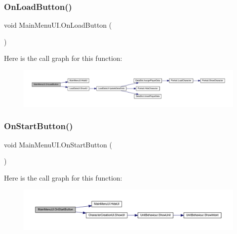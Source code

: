 \subsubsection{\texorpdfstring{OnLoadButton()}{OnLoadButton()}}
{\footnotesize\ttfamily void Main\+Menu\+U\+I.\+On\+Load\+Button (\begin{DoxyParamCaption}{ }\end{DoxyParamCaption})}

Here is the call graph for this function\+:\nopagebreak
\begin{figure}[H]
\begin{center}
\leavevmode
\includegraphics[width=350pt]{class_main_menu_u_i_ab97fc6c28c9bfe985c650c7572aec0fc_cgraph}
\end{center}
\end{figure}
\mbox{\label{class_main_menu_u_i_ac567ba394028f00989750f4782325daf}} 
\subsubsection{\texorpdfstring{OnStartButton()}{OnStartButton()}}
{\footnotesize\ttfamily void Main\+Menu\+U\+I.\+On\+Start\+Button (\begin{DoxyParamCaption}{ }\end{DoxyParamCaption})}

Here is the call graph for this function\+:\nopagebreak
\begin{figure}[H]
\begin{center}
\leavevmode
\includegraphics[width=350pt]{class_main_menu_u_i_ac567ba394028f00989750f4782325daf_cgraph}
\end{center}
\end{figure}
\mbox{\label{class_main_menu_u_i_ab70d817a22e65d2258cfd0d9a48404a8}} 
